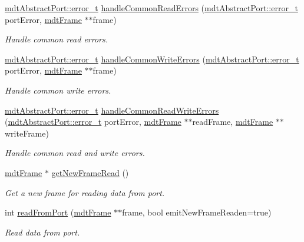 \begin{DoxyCompactItemize}
\item 
\hyperlink{classmdt_abstract_port_ad4121bb930c95887e77f8bafa065a85e}{mdtAbstractPort::error\_\-t} \hyperlink{classmdt_port_thread_a584ee47549b0cb3a9c5de0a1ea496694}{handleCommonReadErrors} (\hyperlink{classmdt_abstract_port_ad4121bb930c95887e77f8bafa065a85e}{mdtAbstractPort::error\_\-t} portError, \hyperlink{classmdt_frame}{mdtFrame} $\ast$$\ast$frame)
\begin{DoxyCompactList}\small\item\em Handle common read errors. \end{DoxyCompactList}\item 
\hyperlink{classmdt_abstract_port_ad4121bb930c95887e77f8bafa065a85e}{mdtAbstractPort::error\_\-t} \hyperlink{classmdt_port_thread_a3ce5b18606f026a8df33ae97a42399b1}{handleCommonWriteErrors} (\hyperlink{classmdt_abstract_port_ad4121bb930c95887e77f8bafa065a85e}{mdtAbstractPort::error\_\-t} portError, \hyperlink{classmdt_frame}{mdtFrame} $\ast$$\ast$frame)
\begin{DoxyCompactList}\small\item\em Handle common write errors. \end{DoxyCompactList}\item 
\hyperlink{classmdt_abstract_port_ad4121bb930c95887e77f8bafa065a85e}{mdtAbstractPort::error\_\-t} \hyperlink{classmdt_port_thread_a1e775d0d943ef7502ae991918155a756}{handleCommonReadWriteErrors} (\hyperlink{classmdt_abstract_port_ad4121bb930c95887e77f8bafa065a85e}{mdtAbstractPort::error\_\-t} portError, \hyperlink{classmdt_frame}{mdtFrame} $\ast$$\ast$readFrame, \hyperlink{classmdt_frame}{mdtFrame} $\ast$$\ast$writeFrame)
\begin{DoxyCompactList}\small\item\em Handle common read and write errors. \end{DoxyCompactList}\item 
\hyperlink{classmdt_frame}{mdtFrame} $\ast$ \hyperlink{classmdt_port_thread_a611211e56620ec9c699019452716e4fc}{getNewFrameRead} ()
\begin{DoxyCompactList}\small\item\em Get a new frame for reading data from port. \end{DoxyCompactList}\item 
int \hyperlink{classmdt_port_thread_a8756fe2a26bf267376b4003a2896ff48}{readFromPort} (\hyperlink{classmdt_frame}{mdtFrame} $\ast$$\ast$frame, bool emitNewFrameReaden=true)
\begin{DoxyCompactList}\small\item\em Read data from port. \end{DoxyCompactList}\item 
$$
\end{DoxyCompactItemize}
